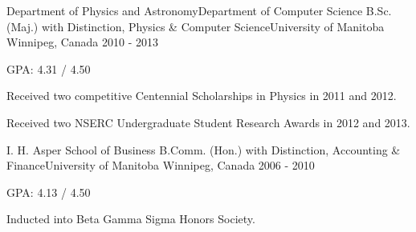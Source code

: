 \begin{cventries}
  \cventry
    {Department of Physics and Astronomy{\enskip\cdotp\enskip}Department of Computer Science} %
    {B.Sc. (Maj.) with Distinction, Physics \& Computer Science{\enskip\cdotp\enskip}University of Manitoba} %
    {Winnipeg, Canada} %
    {2010 - 2013} %
    {
      \begin{cvitems} %
        \item {GPA: 4.31 / 4.50}
        \item {Received two competitive Centennial Scholarships in Physics in 2011 and 2012.}
        \item {Received two NSERC Undergraduate Student Research Awards in 2012 and 2013.}
      \end{cvitems}
    }

  \cventry
    {I. H. Asper School of Business} %
    {B.Comm. (Hon.) with Distinction, Accounting \& Finance{\enskip\cdotp\enskip}University of Manitoba} %
    {Winnipeg, Canada} %
    {2006 - 2010} %
    {
      \begin{cvitems} %
        \item {GPA: 4.13 / 4.50}
        \item {Inducted into Beta Gamma Sigma Honors Society.}
      \end{cvitems}
    }

\end{cventries}
